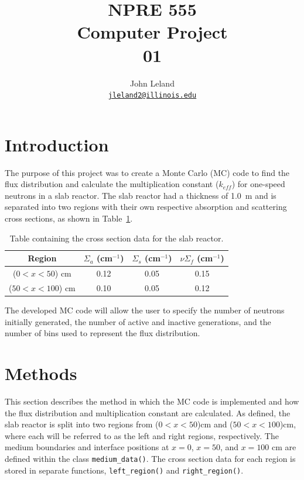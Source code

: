 \documentclass[letterpaper]{article}
\author{John Leland
        \\ \href{mailto:YOUREMAIL@illinois.edu}{\texttt{jleland2@illinois.edu}}
}
\title{NPRE 555\\
Computer Project\\
01}
\begin{document}
\begin{titlepage}
\maketitle
\thispagestyle{empty}
\end{titlepage}

\section{Introduction}
The purpose of this project was to create a Monte Carlo (MC) code to find the flux distribution and calculate the multiplication constant ($k_{eff}$) for one-speed neutrons in a slab reactor. The slab reactor had a thickness of \SI{1.0}{\m} and is separated into two regions with their own respective absorption and scattering cross sections, as shown in Table~\ref{tab:cx_data}.

 \begin{table}[hbt!]
    \caption{Table containing the cross section data for the slab reactor.}
    \label{tab:cx_data}
    \centering
    \begin{tabular}{ |c|ccc| }
    \hline 
  Region & $\Sigma_a$ (cm$^{-1}$) & $\Sigma_s$ (cm$^{-1}$)  & $\nu\Sigma_f$ (cm$^{-1}$) \\
    \hline 
    ($0<x<50$) cm & 0.12 & 0.05 & 0.15 \\
    ($50<x<100$) cm & 0.10 & 0.05 & 0.12  \\
    \hline 
    \end{tabular}
\end{table}

The developed MC code will allow the user to specify the number of neutrons initially generated, the number of active and inactive generations, and the number of bins used to represent the flux distribution.

\section{Methods}
This section describes the method in which the MC code is implemented and how the flux distribution and multiplication constant are calculated. As defined, the slab reactor is split into two regions from ($0<x<50$)cm and ($50<x<100$)cm, where each will be referred to as the left and right regions, respectively. The medium boundaries and interface positions at $x=0$, $x=50$, and $x=100$ cm are defined within the class \texttt{medium\_data()}. The cross section data for each region is stored in separate functions, \texttt{left\_region()} and \texttt{right\_region()}.
\end{document}
